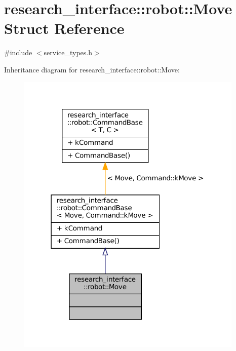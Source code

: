 \hypertarget{structresearch__interface_1_1robot_1_1Move}{}\section{research\+\_\+interface\+:\+:robot\+:\+:Move Struct Reference}
\label{structresearch__interface_1_1robot_1_1Move}


{\ttfamily \#include $<$service\+\_\+types.\+h$>$}



Inheritance diagram for research\+\_\+interface\+:\+:robot\+:\+:Move\+:
\nopagebreak
\begin{figure}[H]
\begin{center}
\leavevmode
\includegraphics[width=307pt]{structresearch__interface_1_1robot_1_1Move__inherit__graph}
\end{center}
\end{figure}


